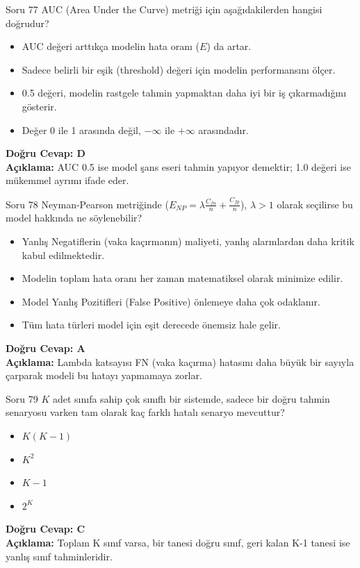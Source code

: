 \documentclass[12pt,a4paper]{article}
\begin{document}
\begin{testcard}{Soru 77}
    AUC (Area Under the Curve) metriği için aşağıdakilerden hangisi doğrudur?
    \begin{itemize}
        \item[A)] AUC değeri arttıkça modelin hata oranı ($E$) da artar.
        \item[B)] Sadece belirli bir eşik (threshold) değeri için modelin performansını ölçer.
        \item[C)] 0.5 değeri, modelin rastgele tahmin yapmaktan daha iyi bir iş çıkarmadığını gösterir.
        \item[D)] Değer 0 ile 1 arasında değil, $-\infty$ ile $+\infty$ arasındadır.
    \end{itemize}
    \tcblower
    \textbf{Doğru Cevap: D} \\
    \textbf{Açıklama:} AUC 0.5 ise model şans eseri tahmin yapıyor demektir; 1.0 değeri ise mükemmel ayrımı ifade eder.
\end{testcard}

\begin{testcard}{Soru 78}
    Neyman-Pearson metriğinde ($E_{NP} = \lambda \frac{C_{fn}}{n} + \frac{C_{fp}}{n}$), $\lambda > 1$ olarak seçilirse bu model hakkında ne söylenebilir?
    \begin{itemize}
        \item[A)] Yanlış Negatiflerin (vaka kaçırmanın) maliyeti, yanlış alarmlardan daha kritik kabul edilmektedir.
        \item[B)] Modelin toplam hata oranı her zaman matematiksel olarak minimize edilir.
        \item[C)] Model Yanlış Pozitifleri (False Positive) önlemeye daha çok odaklanır.
        \item[D)] Tüm hata türleri model için eşit derecede önemsiz hale gelir.
    \end{itemize}
    \tcblower
    \textbf{Doğru Cevap: A} \\
    \textbf{Açıklama:} Lambda katsayısı FN (vaka kaçırma) hatasını daha büyük bir sayıyla çarparak modeli bu hatayı yapmamaya zorlar.
\end{testcard}

\begin{testcard}{Soru 79}
    $K$ adet sınıfa sahip çok sınıflı bir sistemde, sadece bir doğru tahmin senaryosu varken tam olarak kaç farklı hatalı senaryo mevcuttur?
    \begin{itemize}
        \item[A)] $K(K-1)$
        \item[B)] $K^2$
        \item[C)] $K-1$
        \item[D)] $2^K$
    \end{itemize}
    \tcblower
    \textbf{Doğru Cevap: C} \\
    \textbf{Açıklama:} Toplam K sınıf varsa, bir tanesi doğru sınıf, geri kalan K-1 tanesi ise yanlış sınıf tahminleridir.
\end{testcard}
\end{document}
